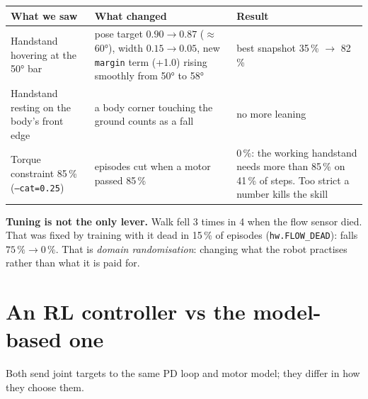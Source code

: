 \documentclass[10pt,letterpaper]{article}
\begin{document}
\begin{small}
\begin{tabularx}{\linewidth}{@{}XXX@{}}
\toprule
\textbf{What we saw} & \textbf{What changed} & \textbf{Result} \\ \midrule
Handstand hovering at the 50° bar & pose target $0.90\to0.87$ ($\approx$\,60°), width $0.15\to0.05$, new \texttt{margin} term (+1.0) rising smoothly from 50° to 58° & best snapshot 35\,\% $\to$ 82\,\% \\
Handstand resting on the body's front edge & a body corner touching the ground counts as a fall & no more leaning \\
Torque constraint 85\,\% (\texttt{--cat=0.25}) & episodes cut when a motor passed 85\,\% & 0\,\%: the working handstand needs more than 85\,\% on 41\,\% of steps. Too strict a number kills the skill \\ \bottomrule
\end{tabularx}
\end{small}

\textbf{Tuning is not the only lever.} Walk fell 3 times in 4 when the flow sensor died. That was fixed by training with it dead in
15\,\% of episodes (\texttt{hw.FLOW\_DEAD}): falls $75\,\%\to0\,\%$. That is \emph{domain randomisation}: changing what the robot
practises rather than what it is paid for.

\section{An RL controller vs the model-based one}

Both send joint targets to the same PD loop and motor model; they differ in how they choose them.
\end{document}

